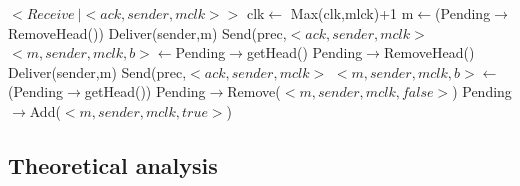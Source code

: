 \documentclass[a4paper]{article}
\begin{document}
\begin{algorithm}[H]
    \centering
    \begin{algorithmic}[5]

        \Event $<Receive\  | <ack,sender, mclk>>$
        \State clk$\gets$ Max(clk,mlck)+1
        \State m$\gets$(Pending$\rightarrow$RemoveHead())
        \State Deliver(sender,m)
        \State Send(prec,$<ack,sender,mclk>$
        \EndIf
        \State $<m,sender,mclk,b>\gets$Pending$\rightarrow$getHead()
        \State Pending$\rightarrow$RemoveHead()
        \State Deliver(sender,m)
        \State Send(prec,$<ack,sender,mclk>$
        \EndIf
        \State $<m,sender,mclk,b>\gets$(Pending$\rightarrow$getHead())
        \EndWhile
        \Else
        \State Pending$\rightarrow$Remove($<m,sender,mclk,false>$)
        \State Pending$\rightarrow$Add($<m,sender,mclk,true>$)
        \EndIf
        \EndEvent
    \end{algorithmic}
\end{algorithm}


\subsection{Theoretical analysis}
\end{document}
